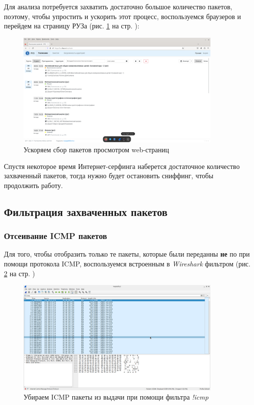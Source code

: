 \documentclass[a4paper]{article}
\begin{document}
  Для анализа потребуется захватить достаточно большое количество пакетов, поэтому,
  чтобы упростить и ускорить этот процесс, воспользуемся браузеров и перейдем на 
  страницу РУЗа (рис. \ref{img:0003} на стр. \pageref{img:0003}):
  
  \begin{figure}[H]
    \centering
    \includegraphics[width=0.9\textwidth]{02_0003}
    \caption{Ускоряем сбор пакетов просмотром web-страниц}
    \label{img:0003}
  \end{figure}

  Спустя некоторое время Интернет-серфинга наберется достаточное количество
  захваченный пакетов, тогда нужно будет остановить сниффинг, чтобы продолжить работу.

  \subsection{Фильтрация захваченных пакетов}

  \subsubsection{Отсеивание ICMP пакетов}

  Для того, чтобы отобразить только те пакеты, которые были переданны \textbf{не} по при помощи протокола 
  ICMP, воспользуемся встроенным в \textit{Wireshark} фильтром (рис. \ref{img:0005} на стр. \pageref{img:0005})

  \begin{figure}[H]
    \centering
    \includegraphics[width=0.9\textwidth]{02_0005}
    \caption{Убираем ICMP пакеты из выдачи при помощи фильтра \textit{!icmp}}
    \label{img:0005}
  \end{figure}
\end{document}

